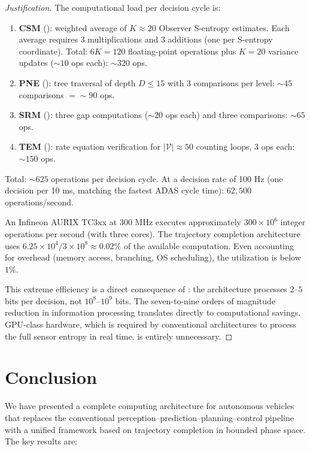 \documentclass[twocolumn,10pt]{article}
\theoremstyle{definition}
\begin{document}
\begin{proof}[Justification]
The computational load per decision cycle is:
\begin{enumerate}
\item \textbf{CSM} (): weighted average of $K \approx 20$ Observer S-entropy estimates. Each average requires $3$ multiplications and $3$ additions (one per S-entropy coordinate). Total: $6K = 120$ floating-point operations plus $K = 20$ variance updates ($\sim 10$ ops each): $\sim 320$ ops.
\item \textbf{PNE} (): tree traversal of depth $D \leq 15$ with $3$ comparisons per level: $\sim 45$ comparisons $= \sim 90$ ops.
\item \textbf{SRM} (): three gap computations ($\sim 20$ ops each) and three comparisons: $\sim 65$ ops.
\item \textbf{TEM} (): rate equation verification for $|\mathcal{V}| \approx 50$ counting loops, $3$ ops each: $\sim 150$ ops.
\end{enumerate}
Total: $\sim 625$ operations per decision cycle. At a decision rate of 100 Hz (one decision per 10 ms, matching the fastest ADAS cycle time): $62{,}500$ operations/second.

An Infineon AURIX TC3xx at 300 MHz executes approximately $300 \times 10^6$ integer operations per second (with three cores). The trajectory completion architecture uses $6.25 \times 10^4 / 3 \times 10^8 \approx 0.02\%$ of the available computation. Even accounting for overhead (memory access, branching, OS scheduling), the utilization is below $1\%$.

This extreme efficiency is a direct consequence of : the architecture processes $2$--$5$ bits per decision, not $10^8$--$10^9$ bits. The seven-to-nine orders of magnitude reduction in information processing translates directly to computational savings. GPU-class hardware, which is required by conventional architectures to process the full sensor entropy in real time, is entirely unnecessary.
\end{proof}


\section{Conclusion}
\label{sec:conclusion}

We have presented a complete computing architecture for autonomous vehicles that replaces the conventional perception--prediction--planning--control pipeline with a unified framework based on trajectory completion in bounded phase space. The key results are:
\end{document}
